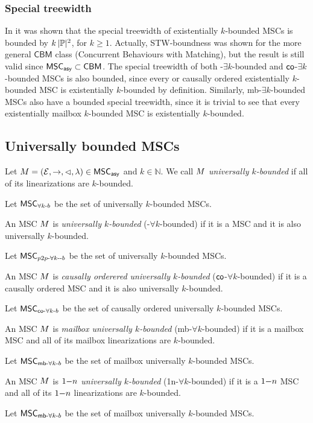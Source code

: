 \documentclass{article}
\begin{document}
\subsubsection{Special treewidth}

In \cite[Lemma 5.37]{DBLP:journals/corr/abs-1904-06942} it was shown that the special treewidth of existentially $k$-bounded MSCs is bounded by $k\,|\mathbb{P}|^2$, for $k \ge 1$. Actually, STW-boundness was shown for the more general $\mathsf{CBM}$ class (Concurrent Behaviours with Matching), but the result is still valid since $\mathsf{MSC}_{\mathsf{asy}} \subset \mathsf{CBM}$.  The special treewidth of both \pp-$\exists k$-bounded and $\mathsf{co}$-$\exists k$-bounded MSCs is also bounded, since every \pp or causally ordered existentially $k$-bounded MSC is existentially $k$-bounded by definition. Similarly, mb-$\exists k$-bounded MSCs also have a bounded special treewidth, since it is trivial to see that every existentially mailbox $k$-bounded MSC is existentially $k$-bounded.

\subsection{Universally bounded MSCs}

\begin{definition}\label{def:uk_bounded_msc}
	Let $M = (\mathcal{E}, \rightarrow, \lhd, \lambda) \in \mathsf{MSC}_{\mathsf{asy}}$ and $k \in \mathbb{N}$. We call $M$ \emph{universally $k$-bounded} if all of its linearizations are $k$-bounded.
\end{definition}
Let $\mathsf{MSC}_{\forall k\text{-}b}$ be the set of universally $k$-bounded MSCs.
\begin{definition}
	An MSC $M$ is \emph{\pp universally $k$-bounded} (\pp-$\forall k$-bounded) if it is a \pp MSC and it is also universally $k$-bounded.
\end{definition}
Let $\mathsf{MSC}_{p2p\text{-}\forall k\text{-}\text{-}b}$ be the set of \pp universally $k$-bounded MSCs.
\begin{definition}
	An MSC $M$ is \emph{causally orderered universally $k$-bounded} ($\mathsf{co}$-$\forall k$-bounded) if it is a causally ordered MSC and it is also universally $k$-bounded.
\end{definition}
Let $\mathsf{MSC}_{\mathsf{co}\text{-}\forall k\text{-}b}$ be the set of causally ordered universally $k$-bounded MSCs.
\begin{definition}
	An MSC $M$ is \emph{mailbox universally $k$-bounded} (mb-$\forall k$-bounded) if it is a mailbox MSC and all of its mailbox linearizations are $k$-bounded.
\end{definition}
Let $\mathsf{MSC}_{\mathsf{mb}\text{-}\forall k\text{-}b}$ be the set of mailbox universally $k$-bounded MSCs.
\begin{definition}
	An MSC $M$ is \emph{$1\mathsf{-}n$ universally $k$-bounded} (1n-$\forall k$-bounded) if it is a $1\mathsf{-}n$ MSC and all of its $1\mathsf{-}n$ linearizations are $k$-bounded.
\end{definition}
Let $\mathsf{MSC}_{\mathsf{mb}\text{-}\forall k\text{-}b}$ be the set of mailbox universally $k$-bounded MSCs.
\end{document}
